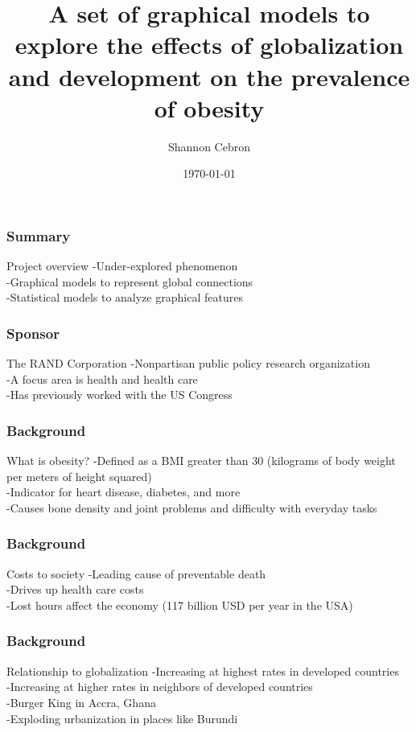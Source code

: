 \documentclass{beamer}
\title[Graphical models of obesity]{A set of graphical models to explore the effects of globalization and development on the prevalence of obesity}
\author{Shannon Cebron}
\institute[Johns Hopkins University]
{
Johns Hopkins University \\
\medskip
{\emph{scebron@cis.jhu.edu}}
}
\date{\today}
\begin{document}
%
\begin{frame}
\titlepage
\end{frame}
%
\begin{frame}
\frametitle{Summary}
\begin{block}
{Project overview}
-Under-explored phenomenon
\\
-Graphical models to represent global connections
\\
-Statistical models to analyze graphical features
\end{block}
\end{frame}
%
\begin{frame}
\frametitle{Sponsor}
\begin{block}
{The RAND Corporation}
-Nonpartisan public policy research organization
\\
-A focus area is health and health care
\\
-Has previously worked with the US Congress
\end{block}
\end{frame}
%

\begin{frame}
\frametitle{Background}
\begin{block}
{What is obesity?}
-Defined as a BMI greater than 30 (kilograms of body weight per meters of height squared)
\\
-Indicator for heart disease, diabetes, and more
\\
-Causes bone density and joint problems and difficulty with everyday tasks
\end{block}
\end{frame}

\begin{frame}
\frametitle{Background}
\begin{block}
{Costs to society}
-Leading cause of preventable death
\\
-Drives up health care costs
\\
-Lost hours affect the economy (117 billion USD per year in the USA)
\end{block}
\end{frame}

\begin{frame}
\frametitle{Background}
\begin{block}
{Relationship to globalization}
-Increasing at highest rates in developed countries
\\
-Increasing at higher rates in neighbors of developed countries
\\
-Burger King in Accra, Ghana
\\
-Exploding urbanization in places like Burundi
\end{block}
\end{frame}
\end{document}
